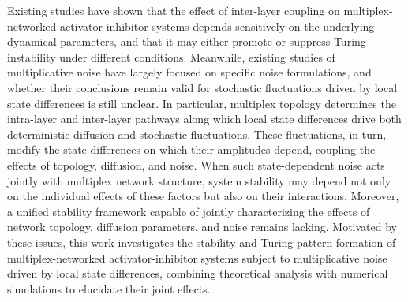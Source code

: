 \documentclass{SCIS2026}
\begin{document}
Existing studies have shown that the effect of inter-layer coupling on multiplex-networked activator-inhibitor systems depends sensitively on the underlying dynamical parameters, and that it may either promote or suppress Turing instability under different conditions.
Meanwhile, existing studies of multiplicative noise have largely focused on specific noise formulations, and whether their conclusions remain valid for stochastic fluctuations driven by local state differences is still unclear.
In particular, multiplex topology determines the intra-layer and inter-layer pathways along which local state differences drive both deterministic diffusion and stochastic fluctuations. These fluctuations, in turn, modify the state differences on which their amplitudes depend, coupling the effects of topology, diffusion, and noise.
When such state-dependent noise acts jointly with multiplex network structure, system stability may depend not only on the individual effects of these factors but also on their interactions.
Moreover, a unified stability framework capable of jointly characterizing the effects of network topology, diffusion parameters, and noise remains lacking.
Motivated by these issues, this work investigates the stability and Turing pattern formation of multiplex-networked activator-inhibitor systems subject to multiplicative noise driven by local state differences, combining theoretical analysis with numerical simulations to elucidate their joint effects.
\end{document}
